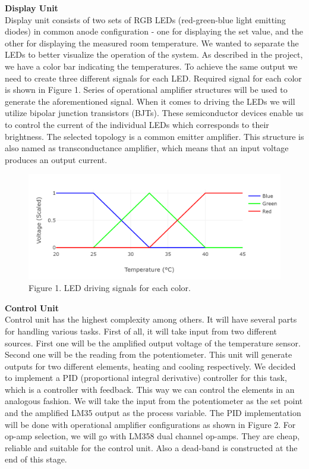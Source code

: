 \documentclass{METUHW} %
\begin{document}
\textbf{ \normalsize Display Unit}\\
    Display unit consists of two sets of RGB LEDs (red-green-blue light emitting diodes) in common anode configuration - one for displaying the set value, and the other for displaying the measured room temperature. We wanted to separate the LEDs to better visualize the operation of the system. As described in the project, we have a color bar indicating the temperatures. To achieve the same output we need to create three different signals for each LED.  Required signal for each color is shown in Figure 1. Series of operational amplifier structures will be used to generate the aforementioned signal. When it comes to driving the LEDs we will utilize bipolar junction transistors (BJTs). These semiconductor devices enable us to control the current of the individual LEDs which corresponds to their brightness. The selected topology is a common emitter amplifier. This structure is also named as  transconductance amplifier, which means that an input voltage produces an output current.


\begin{figure}[H]
\centering
\includegraphics[scale=0.30]{figure/fig1.png}\\
\centering
Figure 1. LED driving signals for each color.
\end{figure}


\textbf{ \normalsize Control Unit}\\
    Control unit has the highest complexity among others. It will have several parts for handling various tasks. First of all, it will take input from two different sources. First one will be the amplified output voltage of the temperature sensor. Second one will be the reading from the potentiometer. This unit will generate outputs for two different elements, heating and cooling respectively. We decided to implement a PID (proportional integral derivative) controller for this task, which is a controller with feedback. This way we can control the elements in an analogous fashion. We will take the input from the potentiometer as the set point and the amplified LM35 output as the process variable. The PID implementation will be done with operational amplifier configurations as shown in Figure 2. For op-amp selection, we will go with LM358 dual channel op-amps. They are cheap, reliable and suitable for the control unit. Also a dead-band is constructed at the end of this stage.
\end{document}
